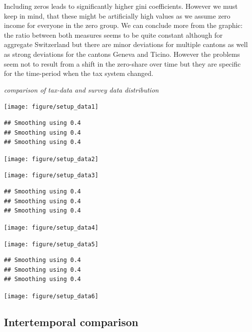 \documentclass[twoside]{article}\usepackage[]{graphicx}\usepackage[]{color}
\makeatletter
\newenvironment{kframe}{%
 \def\at@end@of@kframe{}%
 \ifinner\ifhmode%
  \def\at@end@of@kframe{\end{minipage}}%
  \begin{minipage}{\columnwidth}%
 \fi\fi%
 \def\FrameCommand##1{\hskip\@totalleftmargin \hskip-\fboxsep
 \colorbox{shadecolor}{##1}\hskip-\fboxsep
     \hskip-\linewidth \hskip-\@totalleftmargin \hskip\columnwidth}%
 \MakeFramed {\advance\hsize-\width
   \@totalleftmargin\z@ \linewidth\hsize
   \@setminipage}}%
 {\par\unskip\endMakeFramed%
 \at@end@of@kframe}
\newenvironment{knitrout}{}{} %
\makeatother
\begin{document}
\begin{multicols}{2}
\begin{knitrout}
\end{knitrout}

Including zeros leads to significantly higher gini coefficients. However we must keep in mind, that these might be artificially high values as we assume zero income for everyone in the zero group. We can conclude more from the graphic: the ratio between both measures seems to be quite constant although for aggregate Switzerland but there are minor deviations for multiple cantons as well as strong deviations for the cantons Geneva and Ticino. However the problems seem not to result from a shift in the zero-share over time but they are specific for the time-period when the tax system changed. 

\emph{comparison of tax-data and survey data distribution}

\begin{knitrout}
\color{fgcolor}
\texttt{[image: figure/setup\_data1]} 
\begin{kframe}\begin{verbatim}
## Smoothing using 0.4
## Smoothing using 0.4
## Smoothing using 0.4
\end{verbatim}
\end{kframe}
\texttt{[image: figure/setup\_data2]} 

\texttt{[image: figure/setup\_data3]} 
\begin{kframe}\begin{verbatim}
## Smoothing using 0.4
## Smoothing using 0.4
## Smoothing using 0.4
\end{verbatim}
\end{kframe}
\texttt{[image: figure/setup\_data4]} 

\texttt{[image: figure/setup\_data5]} 
\begin{kframe}\begin{verbatim}
## Smoothing using 0.4
## Smoothing using 0.4
## Smoothing using 0.4
\end{verbatim}
\end{kframe}
\texttt{[image: figure/setup\_data6]} 

\end{knitrout}


\subsection{Intertemporal comparison}







\end{multicols}
\end{document}
